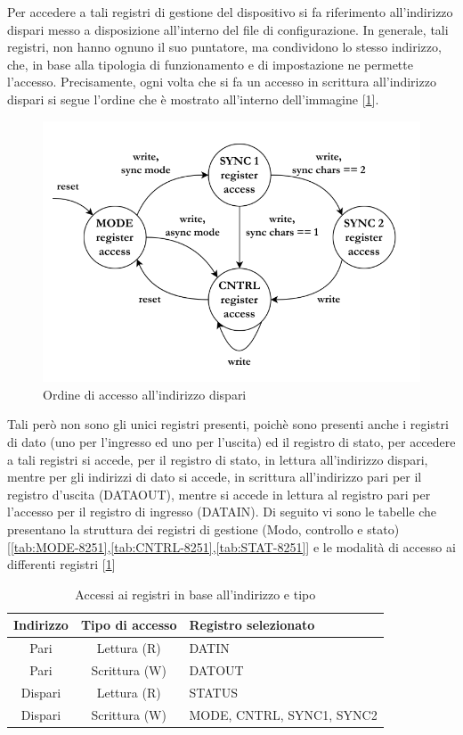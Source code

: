 Per accedere a tali registri di gestione del dispositivo si fa riferimento all'indirizzo dispari messo a disposizione all'interno del file di configurazione. In generale, tali registri, non hanno ognuno il suo puntatore, ma condividono lo stesso indirizzo, che, in base alla tipologia di funzionamento e di impostazione ne permette l'accesso. Precisamente, ogni volta che si fa un accesso in scrittura all'indirizzo dispari si segue l'ordine che è mostrato all'interno dell'immagine [\ref{img:accesso-registri}].

\begin{figure}
    \centering
    \includegraphics[width=.5\textwidth]{img/registri-8251A.png}
    \caption{Ordine di accesso all'indirizzo dispari}\label{img:accesso-registri}
\end{figure}
Tali però non sono gli unici registri presenti, poichè sono presenti anche i registri di dato (uno per l'ingresso ed uno per l'uscita) ed il registro di stato, per accedere a tali registri si accede, per il registro di stato, in lettura all'indirizzo dispari, mentre per gli indirizzi di dato si accede, in scrittura all'indirizzo pari per il registro d'uscita (DATAOUT), mentre si accede in lettura al registro pari per l'accesso per il registro di ingresso (DATAIN). Di seguito vi sono le tabelle che presentano la struttura dei registri di gestione (Modo, controllo e stato) [\ref{tab:MODE-8251},\ref{tab:CNTRL-8251},\ref{tab:STAT-8251}] e le modalità di accesso ai differenti registri [\ref{tab:accessi}]
\begin{table}[h]
    \centering
    \begin{tabular}{|c|c|l|}
    \hline
    \textbf{Indirizzo} & \textbf{Tipo di accesso} & \textbf{Registro selezionato} \\
    \hline
    Pari   & Lettura (R) & DATIN \\
    Pari   & Scrittura (W) & DATOUT \\
    Dispari & Lettura (R) & STATUS \\
    Dispari & Scrittura (W) & MODE, CNTRL, SYNC1, SYNC2 \\
    \hline
    \end{tabular}
    \caption{Accessi ai registri in base all'indirizzo e tipo}\label{tab:accessi}
\end{table}
    
